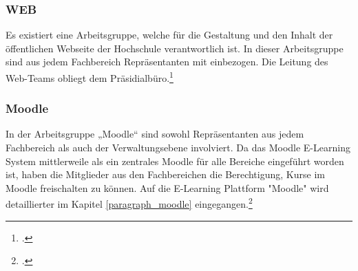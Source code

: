 \subsubsection{WEB}
Es existiert eine Arbeitsgruppe, welche für die Gestaltung und den Inhalt der öffentlichen Webseite der Hochschule verantwortlich ist. In dieser Arbeitsgruppe sind aus jedem Fachbereich Repräsentanten mit einbezogen. Die Leitung des Web-Teams obliegt dem Präsidialbüro.\footcite[Vgl.][]{hsel_prasidialburo_2013}

\subsubsection{Moodle}
In der Arbeitsgruppe „Moodle“ sind sowohl Repräsentanten aus jedem Fachbereich als auch der Verwaltungsebene involviert. Da das Moodle E-Learning System mittlerweile als ein zentrales Moodle für alle Bereiche eingeführt worden ist, haben die Mitglieder aus den Fachbereichen die Berechtigung, Kurse im Moodle freischalten zu können. Auf die E-Learning Plattform "Moodle" wird detaillierter im Kapitel \ref{paragraph_moodle} eingegangen.\footcite{gunter_muller_interview}